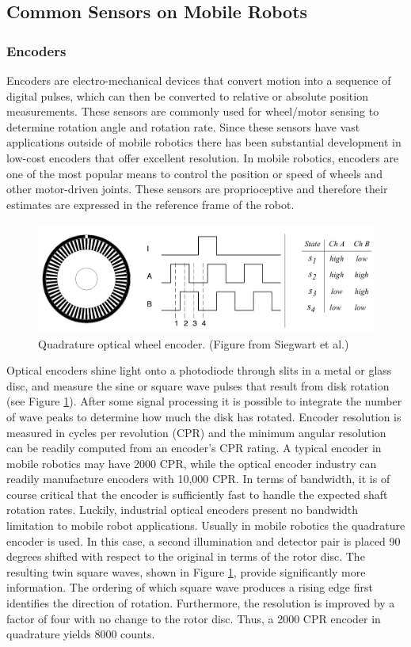 \subsection{Common Sensors on Mobile Robots}
\subsubsection{Encoders} 
Encoders are electro-mechanical devices that convert motion into a sequence of digital pulses, which can then be converted to relative or absolute position measurements. These sensors are commonly used for wheel/motor sensing to determine rotation angle and rotation rate.
Since these sensors have vast applications outside of mobile robotics there has been substantial development in low-cost encoders that offer excellent resolution. In mobile robotics, encoders are one of the most popular means to control the position or speed of wheels and other motor-driven joints. These sensors are proprioceptive and therefore their estimates are expressed in the reference frame of the robot.

\begin{figure}[ht]
\centering
        \includegraphics[width=.9\textwidth]{tex/figs/ch08_figs/wheel_encoder.png}
        \caption{Quadrature optical wheel encoder. (Figure from Siegwart et al.) \nocite{SiegwartNourbakhshEtAl2011}}
        \label{fig:encoder}
\end{figure}
Optical encoders shine light onto a photodiode through slits in a metal or glass disc, and measure the sine or square wave pulses that result from disk rotation (see Figure \ref{fig:encoder}). After some signal processing it is possible to integrate the number of wave peaks to determine how much the disk has rotated.
Encoder resolution is measured in cycles per revolution (CPR) and the minimum angular resolution can be readily computed from an encoder’s CPR rating. A typical encoder in mobile robotics may have 2000 CPR, while the optical encoder industry can readily manufacture encoders with 10,000 CPR. In terms of bandwidth, it is of course critical that the encoder is sufficiently fast to handle the expected shaft rotation rates. Luckily, industrial optical encoders present no bandwidth limitation to mobile robot applications.
Usually in mobile robotics the quadrature encoder is used. In this case, a second illumination and detector pair is placed 90 degrees shifted with respect to the original in terms of the rotor disc. The resulting twin square waves, shown in Figure \ref{fig:encoder}, provide significantly more information. The ordering of which square wave produces a rising edge first identifies the direction of rotation. Furthermore, the resolution is improved by a factor of four with no change to the rotor disc. Thus, a 2000 CPR encoder in quadrature yields 8000 counts.

